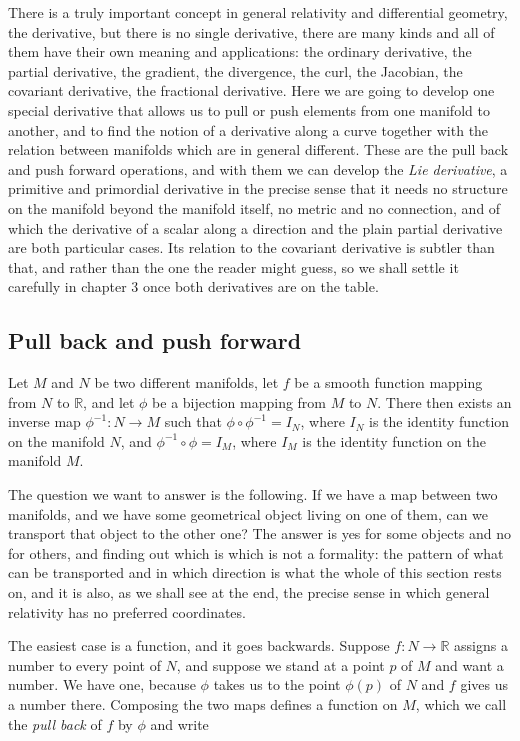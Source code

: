     There is a truly important concept in general relativity and differential geometry, the derivative, but there is no single derivative, there are many kinds and all of them have their own meaning and applications: the ordinary derivative, the partial derivative, the gradient, the divergence, the curl, the Jacobian, the covariant derivative, the fractional derivative. Here we are going to develop one special derivative that allows us to pull or push elements from one manifold to another, and to find the notion of a derivative along a curve together with the relation between manifolds which are in general different. These are the pull back and push forward operations, and with them we can develop the \textit{Lie derivative}, a primitive and primordial derivative in the precise sense that it needs no structure on the manifold beyond the manifold itself, no metric and no connection, and of which the derivative of a scalar along a direction and the plain partial derivative are both particular cases. Its relation to the covariant derivative is subtler than that, and rather than the one the reader might guess, so we shall settle it carefully in chapter 3 once both derivatives are on the table.

    \subsection{Pull back and push forward}

        Let $M$ and $N$ be two different manifolds, let $f$ be a smooth function mapping from $N$ to $\mathbb{R}$, and let $\phi$ be a bijection mapping from $M$ to $N$. There then exists an inverse map $\phi^{-1}: N \rightarrow M$ such that $\phi \circ\phi^{-1} = I_N$, where $I_N$ is the identity function on the manifold $N$, and $\phi^{-1}\circ \phi = I_M$, where $I_M$ is the identity function on the manifold $M$.

        The question we want to answer is the following. If we have a map between two manifolds, and we have some geometrical object living on one of them, can we transport that object to the other one? The answer is yes for some objects and no for others, and finding out which is which is not a formality: the pattern of what can be transported and in which direction is what the whole of this section rests on, and it is also, as we shall see at the end, the precise sense in which general relativity has no preferred coordinates.

        The easiest case is a function, and it goes backwards. Suppose $f: N\rightarrow\mathbb{R}$ assigns a number to every point of $N$, and suppose we stand at a point $p$ of $M$ and want a number. We have one, because $\phi$ takes us to the point $\phi(p)$ of $N$ and $f$ gives us a number there. Composing the two maps defines a function on $M$, which we call the \textit{pull back} of $f$ by $\phi$ and write

